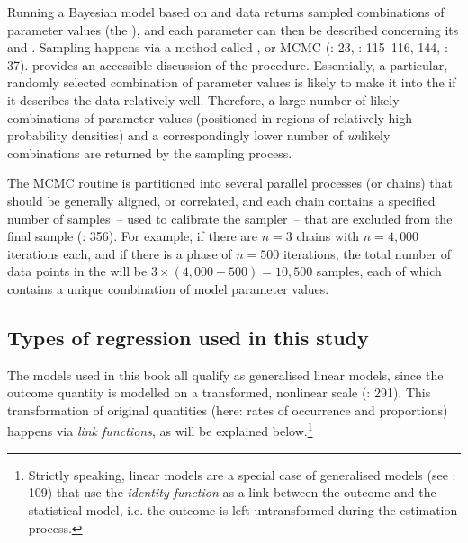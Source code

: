 Running a Bayesian model based on  and data returns sampled combinations of parameter values (the ), and each parameter can then be described concerning its  and . Sampling happens via a method called , or MCMC (\citealt{Agresti2013}: 23, \citealt{Kruschke2015}: 115–116, 144, \citealt{Shikano2015}: 37). \citet[263–298]{McElreath2020} provides an accessible discussion of the procedure. Essentially, a particular, randomly selected combination of parameter values is likely to make it into the  if it describes the data relatively well. Therefore, a large number of likely combinations of parameter values (positioned in regions of relatively high probability densities) and a correspondingly lower number of \textit{un}likely combinations are returned by the sampling process.

The MCMC routine is partitioned into several parallel processes (or chains) that should be generally aligned, or correlated, and each chain contains a specified number of  samples~– used to calibrate the sampler~– that are excluded from the final sample (\citealt{GelmanHill2007}: 356). For example, if there are $n=3$ chains with $n=4{,}000$ iterations each, and if there is a  phase of $n=500$ iterations, the total number of data points in the  will be $3 \times (4{,}000 - 500) = 10{,}500$ samples, each of which contains a unique combination of model parameter values.

\subsection{\label{bkm:Ref52284724}\label{bkm:Ref38459589}\label{bkm:Ref37061243}Types of regression used in this study}\label{sec:6.3.3}\largerpage

The models used in this book all qualify as generalised linear models, since the outcome quantity is modelled on a transformed, nonlinear scale (\citealt{RaudenbushBryk2002}: 291). This transformation of original quantities (here: rates of occurrence and proportions) happens via \textit{link functions}, as will be explained below.{\footnote{Strictly speaking, linear models are a special case of generalised models (see \citealt{GelmanHill2007}: 109) that use the \textit{identity function} as a link between the outcome and the statistical model, i.e. the outcome is left untransformed during the estimation process.}}

